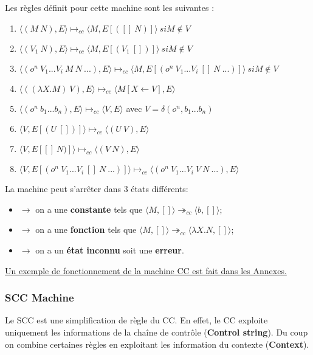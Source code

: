 \documentclass[10pt,a4paper]{article}
\begin{document}
				
				Les règles définit pour cette machine sont les suivantes :
				\begin{enumerate}
					\item $\langle(M~N),E\rangle \longmapsto_{cc} \langle M,E[([]~N)]\rangle~si M \notin V$
					\item $\langle(V_{1}~N),E\rangle \longmapsto_{cc}  \langle M,E[(V_{1}~[])]\rangle~si M \notin V$
					\item $\langle(o^{n}~V_{1}...V_{i}~M~N~...),E\rangle \longmapsto_{cc}  
					\langle M,E[(o^{n}~V_{1}...V_{i}~[]~N~...)]\rangle~ si M \notin V$
					\item $\langle((\lambda X.M)~V),E\rangle \longmapsto_{cc} \langle M[X\longleftarrow V],E\rangle$
					\item $\langle(o^{n}~b_{1}...b_{n}),E\rangle \longmapsto_{cc}  \langle V,E\rangle$ avec $V = \delta(o^{n},b_{1}...b_{n})$ 
					\item $\langle V,E[(U~[])]\rangle \longmapsto_{cc} \langle(U~V),E\rangle$ 
					\item $\langle V,E[[]~N)]\rangle \longmapsto_{cc} \langle(V~N),E\rangle$ 
					\item $\langle V,E[(o^{n}~V_{1}...V_{i}~[]~N~...)]\rangle \longmapsto_{cc} \langle(o^{n}~V_{1}...V_{i}~V~N ~...),E\rangle$ 
				\end{enumerate}
				\bigbreak
				
				
				La machine peut s'arrêter dans 3 états différents:
				\begin{itemize}
					\item[]$\longrightarrow$ on a une \textbf{constante} tels que $\langle M,[]\rangle \twoheadrightarrow_{cc} \langle b,[]\rangle$;
					\item[]$\longrightarrow$ on a une \textbf{fonction} tels que $\langle M,[]\rangle \twoheadrightarrow_{cc} \langle\lambda X.N,[]\rangle$;
					\item[]$\longrightarrow$ on a un \textbf{état inconnu} soit une \textbf{erreur}.
				\end{itemize}
				\smallbreak
				\hyperref[CC]{Un exemple de fonctionnement de la machine CC est fait dans les Annexes.}
				\bigbreak
				
			
			\subsubsection{SCC Machine}
		
				Le SCC est une simplification de règle du CC. En effet, le CC exploite uniquement les informations de la chaîne de contrôle (\textbf{Control string}). Du coup on combine certaines règles en exploitant les information du contexte (\textbf{Context}).
				\bigbreak
				
\end{document}
